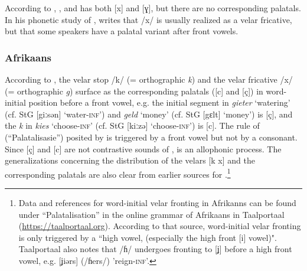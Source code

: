 According to \citet[67]{Sjölin1969}, \citet[65]{Fort1980}, and \citet[412]{Fort2001}  has both [x] and [ɣ], but there are no corresponding palatals. In his phonetic study of , \citet{Peters2017} writes that /x/ is usually realized as a velar fricative, but that some speakers have a palatal variant after front vowels.

\subsubsection{Afrikaans}
According to \citet[80]{CombrinkStadler1987}, the velar stop /k/ (= orthographic \textit{k}) and the velar fricative /x/ (= orthographic \textit{g}) surface as the corresponding palatals ([c] and [ç]) in word-initial position before a front vowel, e.g. the initial segment in \textit{gieter} ‘watering’ (cf. StG [giːsən] ‘water-\textsc{inf}’) and \textit{geld} ‘money’ (cf. StG [gɛlt] ‘money’) is [ç], and the \textit{k} in \textit{kies} ‘choose-\textsc{inf}’ (cf. StG [kiːzə] ‘choose-\textsc{inf}’) is [c]. The rule of  (“Palatalisasie”) posited by \citet[80]{CombrinkStadler1987} is triggered by a front vowel but not by a consonant. Since [ç] and [c] are not contrastive sounds of ,  is an allophonic process. The generalizations concerning the distribution of the velars [k x] and the corresponding palatals are also clear from earlier sources for  \citep{Wilson1964, DeVilliers1969}.\footnote{Data and references for word-initial velar fronting in Afrikanns can be found under “Palatalisation” in the online grammar of Afrikaans in Taalportaal (\url{https://taalportaal.org}). According to that source, word-initial velar fronting is only triggered by a “high vowel, (especially the high front [i] vowel)". Taalportaal also notes that /ɦ/ undergoes fronting to [ʝ] before a high front vowel, e.g. [ʝiərs] (/ɦers/) 'reign-\textsc{inf}'.}



